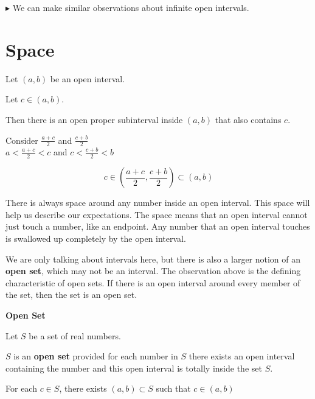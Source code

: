 \documentclass{ximera}
\begin{document}
$\blacktriangleright$ We can make similar observations about infinite open intervals. \\





\section{Space}

\begin{observation} 


Let $(a,b)$ be an open interval.

Let $c \in (a,b)$.

Then there is an open proper subinterval inside $(a,b)$ that also contains $c$.

\begin{explanation}


Consider $\frac{a+c}{2}$ and  $\frac{c+b}{2}$ \\

$a < \frac{a+c}{2} < c$ and  $c < \frac{c+b}{2}  < b$



\[   c \in \left(\frac{a+c}{2} , \frac{c+b}{2} \right) \subset (a,b)              \]

\end{explanation}
\end{observation}


There is always space around any number inside an open interval.  This space will help us describe our expectations.  The space means that an open interval cannot just touch a number, like an endpoint.  Any number that an open interval touches is swallowed up completely by the open interval.


We are only talking about intervals here, but there is also a larger notion of an \textbf{open set}, which may not be an interval.  The observation above is the defining characteristic of open sets.  If there is an open interval around every member of the set, then the set is an open set.




\begin{definition} \textbf{\textcolor{green!50!black}{Open Set}} 


Let $S$ be a set of real numbers. 

$S$ is an \textbf{open set} provided for each number in $S$ there exists an open interval containing the number and this open interval is totally inside the set $S$.

\begin{center}
For each $c \in S$, there exists $(a,b) \subset S$ such that $c \in (a,b)$
\end{center}

\end{definition}
\end{document}
